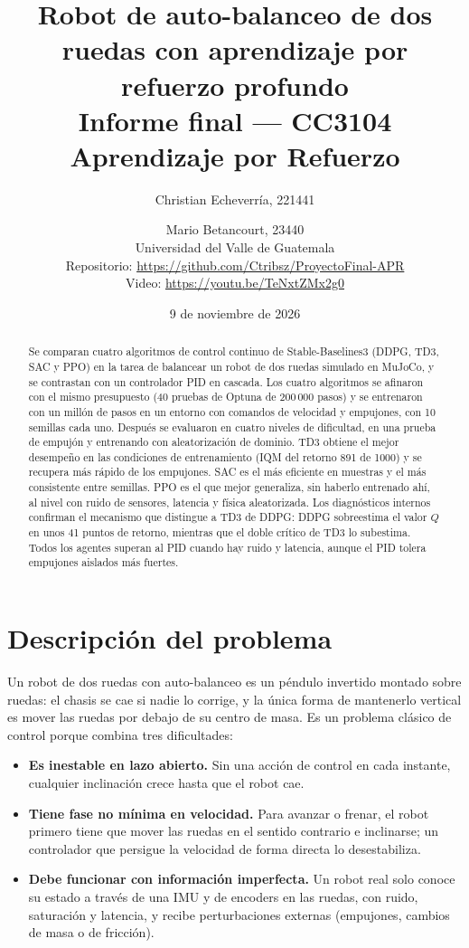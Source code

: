 \documentclass[11pt,a4paper]{article}
\title{\textbf{Robot de auto-balanceo de dos ruedas con aprendizaje por refuerzo profundo}\\[4pt]
\large Informe final --- CC3104 Aprendizaje por Refuerzo}
\author{Christian Echeverría, 221441 \and Mario Betancourt, 23440\\[2pt]
\small Universidad del Valle de Guatemala\\[2pt]
\small Repositorio: \url{https://github.com/Ctribsz/ProyectoFinal-APR}\\[2pt]
\small Video: \url{https://youtu.be/TeNxtZMx2g0}}
\date{9 de noviembre de 2026}
\begin{document}
\maketitle

\begin{abstract}
Se comparan cuatro algoritmos de control continuo de Stable-Baselines3 (DDPG, TD3, SAC y PPO) en la tarea de balancear un robot de dos ruedas simulado en MuJoCo, y se contrastan con un controlador PID en cascada. Los cuatro algoritmos se afinaron con el mismo presupuesto (40 pruebas de Optuna de 200\,000 pasos) y se entrenaron con un millón de pasos en un entorno con comandos de velocidad y empujones, con 10 semillas cada uno. Después se evaluaron en cuatro niveles de dificultad, en una prueba de empujón y entrenando con aleatorización de dominio. TD3 obtiene el mejor desempeño en las condiciones de entrenamiento (IQM del retorno 891 de 1000) y se recupera más rápido de los empujones. SAC es el más eficiente en muestras y el más consistente entre semillas. PPO es el que mejor generaliza, sin haberlo entrenado ahí, al nivel con ruido de sensores, latencia y física aleatorizada. Los diagnósticos internos confirman el mecanismo que distingue a TD3 de DDPG: DDPG sobreestima el valor $Q$ en unos 41 puntos de retorno, mientras que el doble crítico de TD3 lo subestima. Todos los agentes superan al PID cuando hay ruido y latencia, aunque el PID tolera empujones aislados más fuertes.
\end{abstract}

\tableofcontents

\section{Descripción del problema}

Un robot de dos ruedas con auto-balanceo es un péndulo invertido montado sobre ruedas: el chasis se cae si nadie lo corrige, y la única forma de mantenerlo vertical es mover las ruedas por debajo de su centro de masa. Es un problema clásico de control porque combina tres dificultades:
\begin{itemize}
  \item \textbf{Es inestable en lazo abierto.} Sin una acción de control en cada instante, cualquier inclinación crece hasta que el robot cae.
  \item \textbf{Tiene fase no mínima en velocidad.} Para avanzar o frenar, el robot primero tiene que mover las ruedas en el sentido contrario e inclinarse; un controlador que persigue la velocidad de forma directa lo desestabiliza.
  \item \textbf{Debe funcionar con información imperfecta.} Un robot real solo conoce su estado a través de una IMU y de encoders en las ruedas, con ruido, saturación y latencia, y recibe perturbaciones externas (empujones, cambios de masa o de fricción).
\end{itemize}
\end{document}
